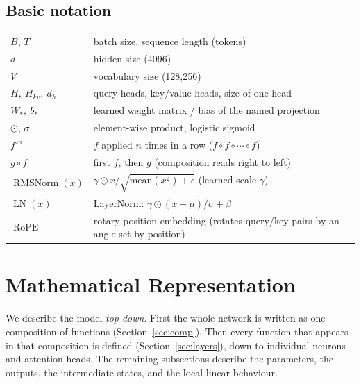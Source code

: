 \documentclass[10pt,a4paper]{article}
\newcommand{\op}[1]{\operatorname{#1}}
\theoremstyle{definition}
\begin{document}
\subsection*{Basic notation}
\begin{tabular}{ll}
\toprule
$B$, $T$ & batch size, sequence length (tokens) \\
$d$ & hidden size (4096) \\
$V$ & vocabulary size (128,256) \\
$H,\ H_{kv},\ d_h$ & query heads, key/value heads, size of one head \\
$W_\ast,\ b_\ast$ & learned weight matrix / bias of the named projection \\
$\odot$, $\sigma$ & element-wise product, logistic sigmoid \\
$f^{\circ n}$ & $f$ applied $n$ times in a row ($f\circ f\circ\cdots\circ f$) \\
$g \circ f$ & first $f$, then $g$ (composition reads right to left) \\
$\op{RMSNorm}(x)$ & $\gamma \odot x / \sqrt{\mathrm{mean}(x^2)+\epsilon}$ (learned scale $\gamma$) \\
$\op{LN}(x)$ & LayerNorm: $\gamma\odot(x-\mu)/\sigma + \beta$ \\
$\op{RoPE}$ & rotary position embedding (rotates query/key pairs by an angle set by position) \\
\bottomrule
\end{tabular}
\section{Mathematical Representation}\label{sec:func}
We describe the model \emph{top-down}. First the whole network is written as one composition of functions (Section~\ref{sec:comp}). Then every function that appears in that composition is defined (Section~\ref{sec:layers}), down to individual neurons and attention heads. The remaining subsections describe the parameters, the outputs, the intermediate states, and the local linear behaviour.
\end{document}
